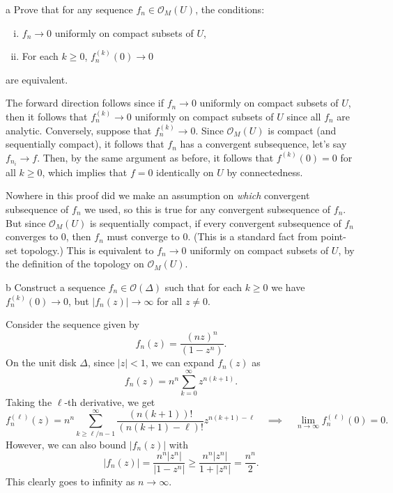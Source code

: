 \documentclass{pset}
\begin{document}
\begin{parts}
  \begin{part}{a}
    Prove that for any sequence $f_n \in \mathcal{O}_M(U)$, the conditions:
    \begin{enumerate}[(i)]
      \item $f_n \to 0$ uniformly on compact subsets of $U$, 
      \item For each $k\geq 0$, $f_n^{(k)}(0) \to 0$
    \end{enumerate}
    are equivalent.
  \end{part}

  The forward direction follows since if $f_n \to 0$ uniformly on compact subsets of $U$, then it follows that $f^(k)_n \to 0$ uniformly on compact subsets of $U$ since all $f_n$ are analytic. 
  Conversely, suppose that $f_n^{(k)} \to 0$. Since $\mathcal{O}_M(U)$ is compact (and sequentially compact), it follows that $f_n$ has a convergent subsequence, let's say $f_{n_i} \to f$. 
  Then, by the same argument as before, it follows that $f^{(k)}(0)=0$ for all $k\geq 0$, which implies that $f = 0$ identically on $U$ by connectedness. 

  Nowhere in this proof did we make an assumption on \emph{which} convergent subsequence of $f_n$ we used, so this is true for any convergent subsequence of $f_n$. But since $\mathcal{O}_M(U)$ is sequentially compact, if every convergent subsequence of $f_n$ converges to $0$, then $f_n$ must converge to $0$. (This is a standard fact from point-set topology.)
  This is equivalent to $f_n \to 0$ uniformly on compact subsets of $U$, by the definition of the topology on $\mathcal{O}_M(U)$.

  \begin{part}{b}
    Construct a sequence $f_n \in \mathcal{O}(\Delta)$ such that for each $k\geq 0$ we have $f_n^{(k)}(0) \to 0$, but $|f_n(z)|\to \infty$ for all $z\neq 0$.
  \end{part}

  Consider the sequence given by 
  \[f_n(z) = \frac{(nz)^n}{(1-z^n)}.\]
  On the unit disk $\Delta$, since $|z|<1$, we can expand $f_n(z)$ as 
  \[
    f_n(z) = n^n\sum^\infty_{k=0} z^{n(k+1)}.
  \]
  Taking the $\ell$-th derivative, we get
  \[f^{(\ell)}_n(z) = n^n\sum^\infty_{k\geq \ell / n - 1} \frac{(n(k+1))!}{(n(k+1) - \ell)!} z^{n(k+1)-\ell}\quad\implies\quad \lim_{n\to \infty} f^{(\ell)}_n(0) = 0.\]
  However, we can also bound $|f_n(z)|$ with
  \[|f_n(z)| = \frac{n^n |z^n|}{|1-z^n|} \geq \frac{n^n |z^n|}{1+|z^n|} =\frac{n^n}{2}.\]
  This clearly goes to infinity as $n\to \infty$.
\end{parts}
\end{document}
